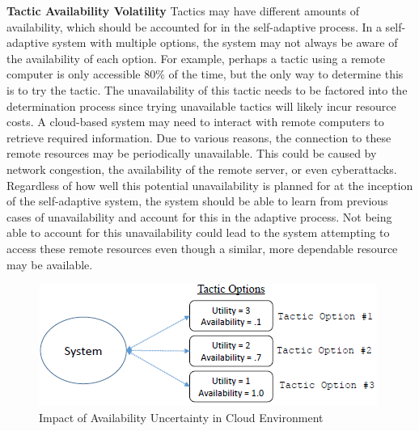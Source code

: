 \documentclass[11pt]{proposalnsf}
\newlength\q %
\begin{document}
\begin{sloppypar}
\vspace{3mm} \noindent \textbf{Tactic Availability Volatility} Tactics may have different amounts of availability, which should be accounted for in the self-adaptive process. In a self-adaptive system with multiple options, the system may not always be aware of the availability of each option. For example, perhaps a tactic using a remote computer is only accessible 80\% of the time, but the only way to determine this is to try the tactic. The unavailability of this tactic needs to be factored into the determination process since trying unavailable tactics will likely incur resource costs. A cloud-based system may need to interact with remote computers to retrieve required information. Due to various reasons, the connection to these remote resources may be periodically unavailable. This could be caused by network congestion, the availability of the remote server, or even cyberattacks. Regardless of how well this potential unavailability is planned for at the inception of the self-adaptive system, the system should be able to learn from previous cases of unavailability and account for this in the adaptive process. Not being able to account for this unavailability could lead to the system attempting to access these remote resources even though a similar, more dependable resource may be available. 



\begin{figure}[h]
	\centering
    \includegraphics[scale=0.7]{images/CloudAvailabilityExample.png}
    \caption{Impact of Availability Uncertainty in Cloud Environment}
    \label{fig:CloudUnavailabilityExample}
\end{figure}


\end{sloppypar}
\end{document}
